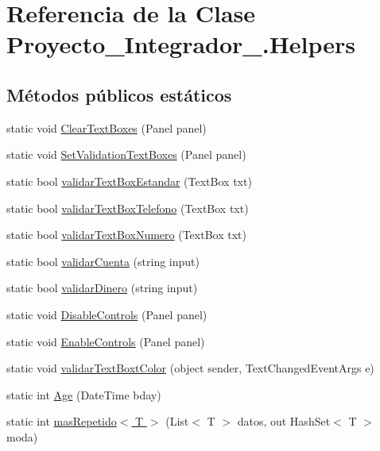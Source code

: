 \hypertarget{class_proyecto___integrador__3_1_1_helpers}{\section{Referencia de la Clase Proyecto\-\_\-\-Integrador\-\_.\-Helpers}
\label{class_proyecto___integrador__3_1_1_helpers}
}
\subsection*{Métodos públicos estáticos}
\begin{DoxyCompactItemize}
\item 
static void \hyperlink{class_proyecto___integrador__3_1_1_helpers_ada922af713da8f3446fd27a8b3ac3494}{Clear\-Text\-Boxes} (Panel panel)
\item 
static void \hyperlink{class_proyecto___integrador__3_1_1_helpers_aaede5d9d02c3e31c447e3e9abf113afa}{Set\-Validation\-Text\-Boxes} (Panel panel)
\item 
static bool \hyperlink{class_proyecto___integrador__3_1_1_helpers_ad5d8f36513117018c7ade0f2d6889222}{validar\-Text\-Box\-Estandar} (Text\-Box txt)
\item 
static bool \hyperlink{class_proyecto___integrador__3_1_1_helpers_ad9d7083d38ed1ad33bac8ef8e0dfea09}{validar\-Text\-Box\-Telefono} (Text\-Box txt)
\item 
static bool \hyperlink{class_proyecto___integrador__3_1_1_helpers_aec73f44f21b6083802bdb77128435771}{validar\-Text\-Box\-Numero} (Text\-Box txt)
\item 
static bool \hyperlink{class_proyecto___integrador__3_1_1_helpers_ab0cb9ffb08e0c4d6dd3c95852411fdec}{validar\-Cuenta} (string input)
\item 
static bool \hyperlink{class_proyecto___integrador__3_1_1_helpers_a36afc3d70450850731fc7b24735e9342}{validar\-Dinero} (string input)
\item 
static void \hyperlink{class_proyecto___integrador__3_1_1_helpers_a7724b85162da445ab1ff1e54cf0974f2}{Disable\-Controls} (Panel panel)
\item 
static void \hyperlink{class_proyecto___integrador__3_1_1_helpers_abf9eb7a688a873f0767ce5dc5bd6f5af}{Enable\-Controls} (Panel panel)
\item 
static void \hyperlink{class_proyecto___integrador__3_1_1_helpers_afc8b1c92d8b5e218247f0295580dea13}{validar\-Text\-Boxt\-Color} (object sender, Text\-Changed\-Event\-Args e)
\item 
static int \hyperlink{class_proyecto___integrador__3_1_1_helpers_af0574bab82d761e6432dfae128e68a6c}{Age} (Date\-Time bday)
\item 
static int \hyperlink{class_proyecto___integrador__3_1_1_helpers_a6bc9de476926295b0feb8f636cc39f31}{mas\-Repetido$<$ T $>$} (List$<$ T $>$ datos, out Hash\-Set$<$ T $>$ moda)
\end{DoxyCompactItemize}


